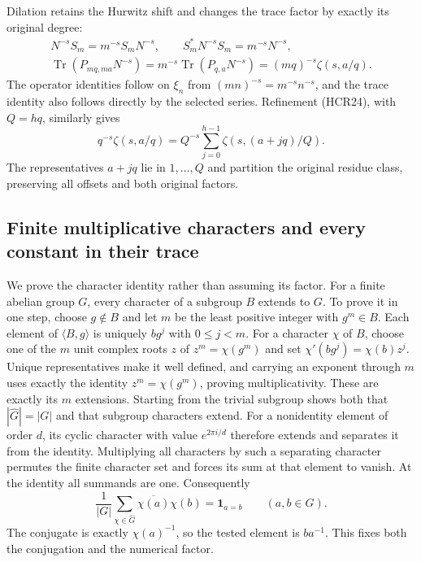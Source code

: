 Dilation retains the Hurwitz shift and changes the
trace factor by exactly its original degree:
\begin{equation}\tag{HCR31}
\begin{gathered}
 N^{-s}S_m=m^{-s}S_mN^{-s},\qquad
 S_m^*N^{-s}S_m=m^{-s}N^{-s},\\
 \operatorname{Tr}(P_{mq,ma}N^{-s})
   =m^{-s}\operatorname{Tr}(P_{q,a}N^{-s})
   =(mq)^{-s}\zeta(s,a/q).
\end{gathered}
\end{equation}
The operator identities follow on $\xi_n$ from
$(mn)^{-s}=m^{-s}n^{-s}$, and the trace identity also
follows directly by the selected series. Refinement
(HCR24), with $Q=hq$, similarly gives
\begin{equation}\tag{HCR32}
 q^{-s}\zeta(s,a/q)
    =Q^{-s}\sum_{j=0}^{h-1}\zeta(s,(a+jq)/Q).
\end{equation}
The representatives $a+jq$ lie in $1,\ldots,Q$ and
partition the original residue class, preserving all
offsets and both original factors.

\subsection{Finite multiplicative characters and every constant in their trace}

We prove the character identity rather than assuming its
factor. For a finite abelian group $G$, every character
of a subgroup $B$ extends to $G$. To prove it in one
step, choose $g\notin B$ and let $m$ be the least
positive integer with $g^m\in B$. Each element of
$\langle B,g\rangle$ is uniquely $bg^j$ with $0\le j<m$.
For a character $\chi$ of $B$, choose one of the $m$
unit complex roots $z$ of $z^m=\chi(g^m)$ and set
$\chi'(bg^j)=\chi(b)z^j$. Unique representatives make
it well defined, and carrying an exponent through $m$
uses exactly the identity $z^m=\chi(g^m)$, proving
multiplicativity. These are exactly its $m$ extensions.
Starting from the trivial subgroup shows both that
$|\widehat G|=|G|$ and that subgroup characters extend.
For a nonidentity element of order $d$, its cyclic
character with value $e^{2\pi i/d}$ therefore extends
and separates it from the identity. Multiplying all
characters by such a separating character permutes
the finite character set and forces its sum at that
element to vanish. At the identity all summands are
one. Consequently
\begin{equation}\tag{HCR33}
 \frac1{|G|}\sum_{\chi\in\widehat G}
            \overline{\chi(a)}\chi(b)=\mathbf1_{a=b}
                         \qquad(a,b\in G).
\end{equation}
The conjugate is exactly $\chi(a)^{-1}$, so the tested
element is $ba^{-1}$. This fixes both the conjugation
and the numerical factor.


